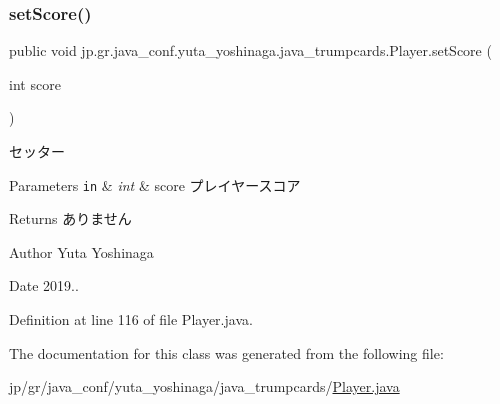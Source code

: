 \subsubsection{\texorpdfstring{set\+Score()}{setScore()}}
{\footnotesize\ttfamily public void jp.\+gr.\+java\+\_\+conf.\+yuta\+\_\+yoshinaga.\+java\+\_\+trumpcards.\+Player.\+set\+Score (\begin{DoxyParamCaption}\item[{int}]{score }\end{DoxyParamCaption})}



セッター 


\begin{DoxyParams}[1]{Parameters}
\mbox{\tt in}  & {\em int} & score プレイヤースコア \\
\hline
\end{DoxyParams}
\begin{DoxyReturn}{Returns}
ありません 
\end{DoxyReturn}
\begin{DoxyAuthor}{Author}
Yuta Yoshinaga 
\end{DoxyAuthor}
\begin{DoxyDate}{Date}
2019.. 
\end{DoxyDate}


Definition at line 116 of file Player.\+java.



The documentation for this class was generated from the following file\+:\begin{DoxyCompactItemize}
\item 
jp/gr/java\+\_\+conf/yuta\+\_\+yoshinaga/java\+\_\+trumpcards/\hyperlink{_player_8java}{Player.\+java}\end{DoxyCompactItemize}
